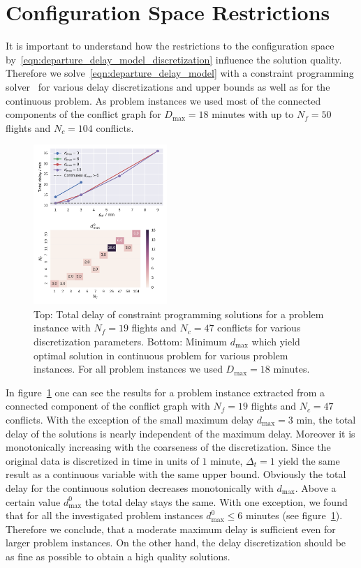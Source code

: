 \section{Configuration Space Restrictions}
It is important to understand how the restrictions to the configuration space by~\eqref{eqn:departure_delay_model_discretization} influence the solution quality.
Therefore we solve~\eqref{eqn:departure_delay_model} with a constraint programming solver~\cite{numberjack} for various delay discretizations and upper bounds as well as for the continuous problem.
As problem instances we used most of the connected components of the conflict graph for $D_\text{max}=18$ minutes with up to $N_f=50$ flights and $N_c=104$ conflicts.
\begin{figure}[htpb]
    \centering
    \includegraphics[width=0.45\textwidth]{./pics/delay_only_cp_results.pdf}
    \caption{Top: Total delay of constraint programming solutions for a problem instance with $N_f=19$ flights and $N_c=47$ conflicts for various discretization parameters.
    Bottom: Minimum $d_\text{max}$ which yield optimal solution in continuous problem for various problem instances. For all problem instances we used $D_\text{max}=18$ minutes.}
\label{fig:delay_only_cp_results}
\end{figure}

In figure~\ref{fig:delay_only_cp_results} one can see the results for a problem instance extracted from a connected component of the conflict graph with $N_f=19$ flights and $N_c=47$ conflicts.
With the exception of the small maximum delay $d_\text{max} = 3$ min, the total delay of the solutions is nearly independent of the maximum delay.
Moreover it is monotonically increasing with the coarseness of the discretization.
Since the original data is discretized in time in units of $1$ minute, $\Delta_t=1$ yield the same result as a continuous variable with the same upper bound.
Obviously the total delay for the continuous solution decreases monotonically with $d_\text{max}$.
Above a certain value $d^0_\text{max}$ the total delay stays the same.
With one exception, we found that for all the investigated problem instances $d^0_\text{max}\leq6$ minutes (see figure~\ref{fig:delay_only_cp_results}).
Therefore we conclude, that a moderate maximum delay is sufficient even for larger problem instances.
On the other hand, the delay discretization should be as fine as possible to obtain a high quality solutions.

